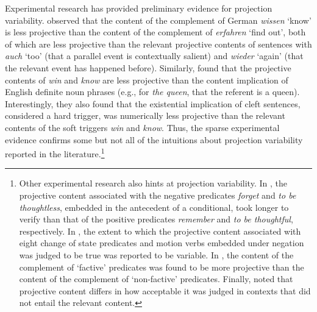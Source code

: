 \documentclass[11pt,fleqn]{article}
\newcommand{\6}{\mbox{$[\hspace*{-.6mm}[$}}
\newcommand{\9}{\mbox{$]\hspace*{-.6mm}]$}}
\begin{document}
Experimental research has provided preliminary evidence for projection variability. \citet{xue-onea11} observed that the content of the complement of German {\em wissen} `know' is less projective than the content of the complement of {\em erfahren} `find out', both of which are less projective than the relevant projective contents of sentences with {\em auch} `too' (that a parallel event is contextually salient) and {\em wieder} `again' (that the relevant event has happened before). Similarly, \citet{smith-hall11} found that the projective contents of {\em win} and {\em know} are less projective than the content implication of English definite noun phrases (e.g., for {\em the queen}, that the referent is a queen). Interestingly, they also found that the existential implication of cleft sentences, considered a hard trigger, was numerically less projective than the relevant contents of the soft triggers {\em win} and {\em know}. Thus, the sparse experimental evidence confirms some but not all of the intuitions about projection variability reported in the literature.\footnote{Other experimental research also hints at projection variability. In \citealt{just-clark1973}, the projective content associated with the negative predicates {\em forget} and {\em to be thoughtless}, embedded in the antecedent of a conditional, took longer to verify than that of the positive predicates {\em remember} and {\em to be thoughtful}, respectively. In \citealt{harris1974}, the extent to which the projective content associated with eight change of state predicates and motion verbs embedded under negation was judged to be true was reported to be variable. In \citealt{harris1974b}, the content of the complement of `factive' predicates was found to be more projective than the content of the complement of `non-factive' predicates. Finally, \citet{tiemann-etal11} noted that projective content differs in how acceptable it was judged in contexts that did not entail the relevant content.}
\end{document}
